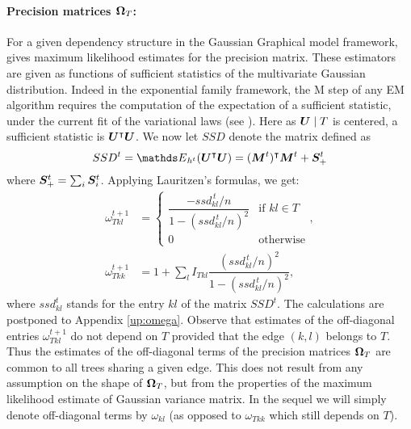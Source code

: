 \paragraph{Precision matrices ${\boldsymbol{\Omega}}_T$:}
For a given dependency structure in the Gaussian Graphical model framework, \cite{Lau96} gives maximum likelihood estimates for the precision matrix. 
These estimators are given as functions of sufficient statistics of the multivariate Gaussian distribution. Indeed in the exponential family framework, the M step of any EM algorithm requires the computation of the expectation of a sufficient statistic, under the current fit of the variational laws (see \citet{mclachlan}). Here as ${\boldsymbol{U}} \mid T$ is centered, a sufficient statistic is ${\boldsymbol{U}}^\intercal {\boldsymbol{U}}$. We now let $SSD$ denote the matrix defined as 
$$
SSD^t = \Esp_{h^t} (\Ubf^\intercal \Ubf) = (\Mbf^t)^\intercal \Mbf^t + \Sbf^t_+
$$
where ${\boldsymbol{S}}^t_+ = \sum_i {\boldsymbol{S}}^t_i$. Applying Lauritzen's formulas, we get:
\begin{align} \label{omegaT}
\omega^{t+1}_{Tkl} & = \left\{
\begin{array}{ll}
\dfrac{ -ssd_{kl}^{\,t}/n}{1-(ssd_{kl}^{\,t}/n)^2} & \text{if } kl \in T \\
0 & \text{otherwise}
\end{array} 
\right., \\
\omega^{t+1}_{Tkk} & = 1 + \sum_l I_{Tkl} \dfrac{(ssd_{kl}^{\,t}/n)^2}{1-(ssd_{kl}^{\,t}/n)^2},
\nonumber
\end{align}
where $ssd^t_{kl}$ stands for the entry $kl$ of the matrix $SSD^t$.
The calculations are postponed to Appendix \ref{up:omega}. Observe that estimates of the off-diagonal entries $\omega^{t+1}_{Tkl}$ do not depend on $T$ provided that the edge $(k, l)$ belongs to $T$.  Thus the estimates of the off-diagonal terms of the precision matrices ${\boldsymbol{\Omega}}_T$ are common to all trees sharing a given edge. This does not result from any assumption on the shape of  ${\boldsymbol{\Omega}}_T$, but from the properties of the maximum likelihood estimate of Gaussian variance matrix. In the sequel we will simply denote off-diagonal terms by $\omega_{kl}$ (as opposed to $\omega_{Tkk}$ which still depends on $T$).\\


